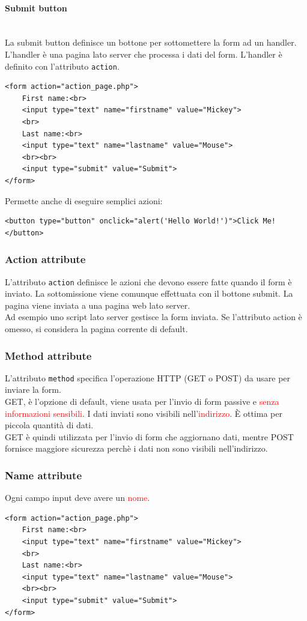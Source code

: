 \documentclass{article}
\begin{document}
\paragraph{Submit button} \mbox{}\\
La submit button definisce un bottone per sottomettere la form ad un handler. L'handler è una pagina lato server che processa i dati del form. L'handler è definito con l'attributo \texttt{action}.
\begin{lstlisting}[style=htmlstyle]
<form action="action_page.php">
    First name:<br>
    <input type="text" name="firstname" value="Mickey">
    <br>
    Last name:<br>
    <input type="text" name="lastname" value="Mouse">
    <br><br>
    <input type="submit" value="Submit">
</form>
\end{lstlisting}
Permette anche di eseguire semplici azioni:
\begin{lstlisting}[style=htmlstyle]
<button type="button" onclick="alert('Hello World!')">Click Me!</button>
\end{lstlisting}
\subsubsection{Action attribute}
L'attributo \texttt{action} definisce le azioni che devono essere fatte quando il form è inviato.
La sottomissione viene comunque effettuata con il bottone submit. La pagina viene inviata a una pagina web lato server.
\\ Ad esempio uno script lato server gestisce la form inviata. Se l'attributo action è omesso, si considera la pagina corrente di default.
\subsubsection{Method attribute}
L'attributo \texttt{method} specifica l'operazione HTTP (GET o POST) da usare per inviare la form.
\\ GET, è l'opzione di default, viene usata per l'invio di form passive e \textcolor{red}{senza informazioni sensibili}. I dati inviati
sono visibili nell'\textcolor{red}{indirizzo}. È ottima per piccola quantità di dati.
\\GET è quindi utilizzata per l'invio di form che aggiornano dati, mentre POST fornisce maggiore sicurezza perchè i dati non sono visibili nell'indirizzo.
\subsubsection{Name attribute}
Ogni campo input deve avere un \textcolor{red}{nome}.
\begin{lstlisting}[style=htmlstyle]
<form action="action_page.php">
    First name:<br>
    <input type="text" name="firstname" value="Mickey">
    <br>
    Last name:<br>
    <input type="text" name="lastname" value="Mouse">
    <br><br>
    <input type="submit" value="Submit">
</form>
\end{lstlisting}
\end{document}
